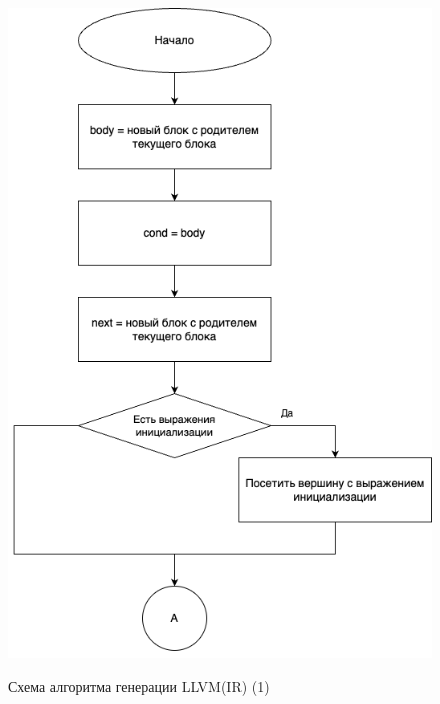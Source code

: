 \begin{figure}[h!]
	\begin{center}
		{\includegraphics[scale = 0.5, angle=0]{../img/llvm/alg-1.png}}
		\caption{Схема алгоритма генерации LLVM(IR) (1)}
		\label{fig:alg-1}
	\end{center}
\end{figure}

